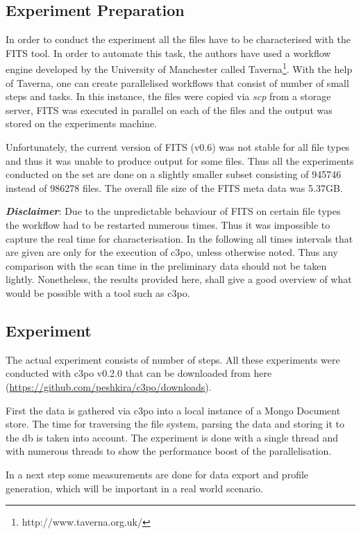 \subsection{Experiment Preparation}
In order to conduct the experiment all the files have to be characterised with the FITS tool.
In order to automate this task, the authors have used a workflow engine developed by the University of Manchester called Taverna\footnote{http://www.taverna.org.uk/}.
With the help of Taverna, one can create parallelised workflows that consist of number of small steps and tasks.
In this instance, the files were copied via \textit{scp} from a storage server, FITS was executed in parallel on each of the files and the output was stored on the experiments machine.

Unfortunately, the current version of FITS (v0.6) was not stable for all file types and thus it was unable to produce output for some files.
Thus all the experiments conducted on the set are done on a slightly smaller subset consisting of 945746 instead of 986278 files. The overall file size of the FITS meta data was 5.37GB.

\textbf{\textit{Disclaimer}}: Due to the unpredictable behaviour of FITS on certain file types the workflow had to be restarted numerous times.
Thus it was impossible to capture the real time for characterisation.
In the following all times intervals that are given are only for the execution of c3po, unless otherwise noted.
Thus any comparison with the scan time in the preliminary data should not be taken lightly.
Nonetheless, the results provided here, shall give a good overview of what would be possible with a tool such as c3po.

\subsection{Experiment}
The actual experiment consists of number of steps.
All these experiments were conducted with c3po v0.2.0 that can be downloaded from here (\url{https://github.com/peshkira/c3po/downloads}). 

First the data is gathered via c3po into a local instance of a Mongo Document store.
The time for traversing the file system, parsing the data and storing it to the db is taken into account.
The experiment is done with a single thread and with numerous threads to show the performance boost of the parallelisation.

In a next step some measurements are done for data export and profile generation, which will be important in a real world scenario.

